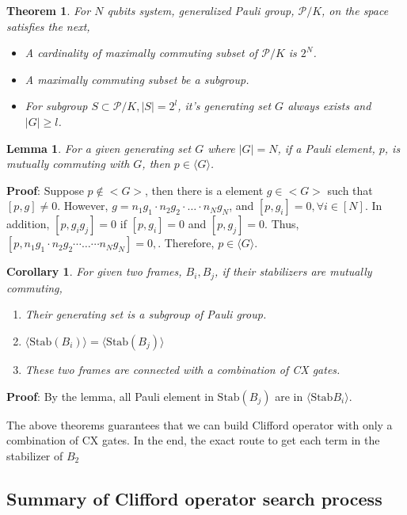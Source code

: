 \documentclass[a4paper,12pt]{article}
\newtheorem{theorem}{Theorem}
\newtheorem{lemma}{Lemma}
\newtheorem{corollary}{Corollary}
\begin{document}
\begin{theorem}
    For $N$ qubits system, generalized Pauli group, $\mathcal{P}/K$, on the space satisfies the next,

    \begin{itemize}
        \item A cardinality of maximally commuting subset of $\mathcal{P}/K$ is $2^N$.
        \item A maximally commuting subset be a subgroup.
        \item For subgroup $S \subset \mathcal{P}/K, |S| = 2^l$, it's generating set $G$ always exists and $|G| \geq l$.
    \end{itemize}
\end{theorem}


\begin{lemma}
    For a given generating set $G$ where $|G| = N$, 
    if a Pauli element, $p$, is mutually commuting with $G$,
    then $p \in \langle G \rangle$.
\end{lemma}

\textbf{Proof}:
Suppose $p \notin <G>$, then there is a element $g\in <G>$ such that
$[p, g] \neq 0$. However, $g = n_1 g_1 \cdot n_2 g_2 \cdot \dots \cdot n_N g_N$, and 
$[p, g_i] = 0, \forall i \in [N]$.
In addition, $[p, g_i g_j] =0$ if $[p, g_i] =0$ and $[p, g_j]=0$.
Thus, $[p, n_1 g_1 \cdot n_2 g_2 \cdots \dots \cdots n_N g_N] =0, \!$.
Therefore, $p \in \langle G \rangle$.

\begin{corollary}
    For given two frames, $B_i, B_j$, if their stabilizers are mutually commuting,
    \begin{enumerate}
        \item Their generating set is a subgroup of Pauli group.
        \item $\langle \mbox{Stab}(B_i)\rangle = \langle \mbox{Stab}(B_j)\rangle$
        \item These two frames are connected with a combination of CX gates.
    \end{enumerate}
\end{corollary}

\textbf{Proof}: 
By the lemma, all Pauli element in $\mbox{Stab}(B_j)$ are in $\langle \mbox{Stab}{B_i} \rangle$.


The above theorems guarantees that we can build Clifford operator 
with only a combination of CX gates. 
In the end, the exact route to get each term in the stabilizer of $B_2$


\subsection{Summary of Clifford operator search process}
\end{document}
